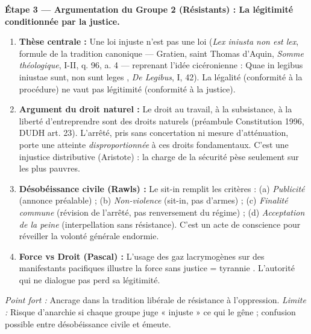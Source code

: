 \documentclass[11pt]{article}
\newcommand{\cle}[1]{{\popxbold\color{popdark}#1}}
\begin{document}
\begin{exoresolu}
\textbf{Étape 3 — Argumentation du Groupe 2 (Résistants) : La légitimité conditionnée par la justice.}
\begin{enumerate}
    \item \textbf{Thèse centrale :} \guillemotleft Une loi injuste n'est pas une loi \guillemotright (\emph{Lex iniusta non est lex}, formule de la tradition canonique — Gratien, saint Thomas d'Aquin, \emph{Somme théologique}, I-II, q. 96, a. 4 — reprenant l'idée cicéronienne : \guillemotleft Quae in legibus iniustae sunt, non sunt leges \guillemotright, \emph{De Legibus}, I, 42). La \cle{légalité} (conformité à la procédure) ne vaut pas \cle{légitimité} (conformité à la justice).
    \item \textbf{Argument du droit naturel :} Le droit au travail, à la subsistance, à la liberté d'entreprendre sont des \cle{droits naturels} (préambule Constitution 1996, DUDH art. 23). L'arrêté, pris sans concertation ni mesure d'atténuation, porte une atteinte \emph{disproportionnée} à ces droits fondamentaux. C'est une \cle{injustice distributive} (Aristote) : la charge de la sécurité pèse seulement sur les plus pauvres.
    \item \textbf{Désobéissance civile (Rawls) :} Le sit-in remplit les critères : (a) \emph{Publicité} (annonce préalable) ; (b) \emph{Non-violence} (sit-in, pas d'armes) ; (c) \emph{Finalité commune} (révision de l'arrêté, pas renversement du régime) ; (d) \emph{Acceptation de la peine} (interpellation sans résistance). C'est un acte de \cle{conscience} pour réveiller la \cle{volonté générale} endormie.
    \item \textbf{Force vs Droit (Pascal) :} L'usage des gaz lacrymogènes sur des manifestants pacifiques illustre la \guillemotleft force sans justice \guillemotright = \guillemotleft tyrannie \guillemotright. L'autorité qui ne dialogue pas perd sa \cle{légitimité}.
\end{enumerate}
\emph{Point fort :} Ancrage dans la tradition libérale de résistance à l'oppression. \emph{Limite :} Risque d'anarchie si chaque groupe juge « injuste » ce qui le gêne ; confusion possible entre désobéissance civile et émeute.


\end{exoresolu}
\end{document}

